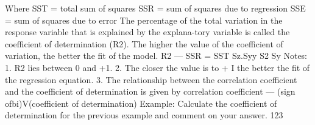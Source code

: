 Where SST = total sum of squares SSR = sum of squares due to regression SSE = sum of squares due to error 
The percentage of the total variation in the response variable that is explained by the explana-tory variable is called the coefficient of determination (R2). The higher the value of the coefficient of variation, the better the fit of the model. 
R2 — SSR = SST Sz.Syy 
S2 Sy 
Notes: 1. R2 lies between 0 and +1. 2. The closer the value is to + I the better the fit of the regression equation. 3. The relationship between the correlation coefficient and the coefficient of determination is given 
by 
correlation coefficient — (sign ofbi)V(coefficient of determination) 
Example: 
Calculate the coefficient of determination for the previous example and comment on your answer. 
123 

